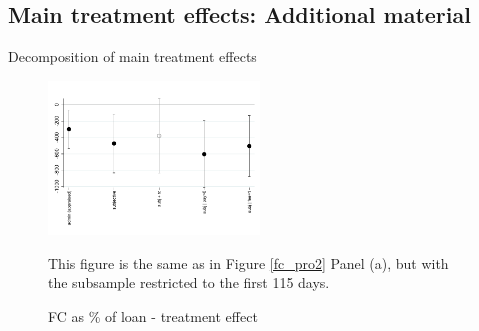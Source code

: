 \documentclass[oneside,11pt]{article}
\begin{document}
\newpage
\subsection{Main treatment effects: Additional material}

\vspace{.2in}

\begin{table}[H]
\caption{Decomposition of main treatment effects}
\label{mechanisms}
\begin{center}
\scriptsize{}
\end{center}

\end{table}



\begin{figure}[H]
        \caption{FC as \% of loan - treatment effect}
    \label{fc_pro_2_115}
    \begin{center}
        \centering
        \includegraphics[width=0.50\textwidth]{Figuras/fc_te_115_pro_2.pdf}
    \end{center}
     \scriptsize This figure is the same as in Figure \ref{fc_pro2} Panel (a), but with the subsample restricted to the first 115 days.
\end{figure}
\end{document}
